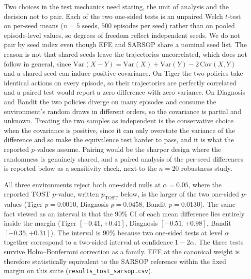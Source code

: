 Two choices in the test mechanics need stating, the unit of analysis and the decision not to pair. Each of the two one-sided tests is an unpaired Welch $t$-test on per-seed means ($n{=}5$ seeds, $500$ episodes per seed) rather than on pooled episode-level values, so degrees of freedom reflect independent seeds. We do not pair by seed index even though EFE and SARSOP share a nominal seed list. The reason is not that shared seeds leave the trajectories uncorrelated, which does not follow in general, since $\mathrm{Var}(X - Y) = \mathrm{Var}(X) + \mathrm{Var}(Y) - 2\,\mathrm{Cov}(X, Y)$ and a shared seed can induce positive covariance. On Tiger the two policies take identical actions on every episode, so their trajectories are perfectly correlated and a paired test would report a zero difference with zero variance. On Diagnosis and Bandit the two policies diverge on many episodes and consume the environment's random draws in different orders, so the covariance is partial and unknown. Treating the two samples as independent is the conservative choice when the covariance is positive, since it can only overstate the variance of the difference and so make the equivalence test harder to pass, and it is what the reported $p$-values assume. Pairing would be the sharper design where the randomness is genuinely shared, and a paired analysis of the per-seed differences is reported below as a sensitivity check, next to the $n{=}20$ robustness study.

All three environments reject both one-sided nulls at $\alpha{=}0.05$, where the reported TOST $p$-value, written $p_{\mathrm{TOST}}$ below, is the larger of the two one-sided $p$-values (Tiger $p{=}0.0010$, Diagnosis $p{=}0.0458$, Bandit $p{=}0.0130$). The same fact viewed as an interval is that the $90\%$ CI of each mean difference lies entirely inside the margin (Tiger $[-0.41,+0.41]$, Diagnosis $[-0.51,+0.98]$, Bandit $[-0.35,+0.31]$). The interval is $90\%$ because two one-sided tests at level $\alpha$ together correspond to a two-sided interval at confidence $1 - 2\alpha$. The three tests survive Holm--Bonferroni correction as a family. EFE at the canonical weight is therefore statistically equivalent to the SARSOP reference within the fixed margin on this suite (\texttt{results\_\allowbreak tost\_\allowbreak sarsop.csv}).

